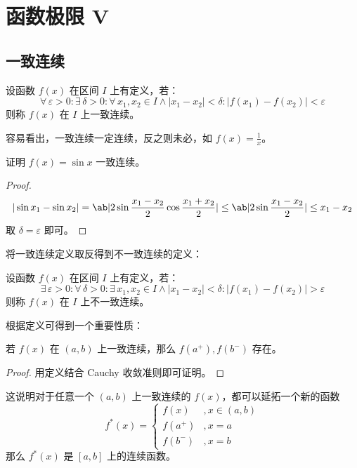 \section{函数极限 V}

\subsection{一致连续}

\begin{definition}[函数的一致连续性]
	设函数 $f(x)$ 在区间 $I$ 上有定义，若：
	$$
	\forall\,\varepsilon > 0: \exists\,\delta > 0: \forall\,x_1, x_2 \in I \land |x_1 - x_2| < \delta: |f(x_1) - f(x_2)| < \varepsilon
	$$
	则称 $f(x)$ 在 $I$ 上一致连续。
\end{definition}

容易看出，一致连续一定连续，反之则未必，如 $f(x) = \frac{1}{x}$。

\begin{example}
	证明 $f(x) = \sin x$ 一致连续。

	\begin{proof}
		$$
		|\sin x_1 - \sin x_2| = \ab|2 \sin \frac{x_1 - x_2}{2} \cos \frac{x_1 + x_2}{2}| \le \ab|2 \sin \frac{x_1 - x_2}{2}| \le x_1 - x_2
		$$
		取 $\delta = \varepsilon$ 即可。
	\end{proof}
\end{example}

将一致连续定义取反得到不一致连续的定义：

\begin{definition}[函数不一致连续]
	设函数 $f(x)$ 在区间 $I$ 上有定义，若：
	$$
	\exists\,\varepsilon > 0: \forall\,\delta > 0: \exists\,x_1, x_2 \in I \land |x_1 - x_2| < \delta: |f(x_1) - f(x_2)| > \varepsilon
	$$
	则称 $f(x)$ 在 $I$ 上不一致连续。
\end{definition}

根据定义可得到一个重要性质：

\begin{theorem}
	若 $f(x)$ 在 $(a, b)$ 上一致连续，那么 $f(a^+), f(b^-)$ 存在。

	\begin{proof}
		用定义结合 Cauchy 收敛准则即可证明。
	\end{proof}
\end{theorem}

这说明对于任意一个 $(a, b)$ 上一致连续的 $f(x)$，都可以延拓一个新的函数
$$
f^*(x) = \begin{cases}
	f(x) & , x \in (a, b) \\
	f(a^+) & , x = a \\
	f(b^-) & , x = b
\end{cases}
$$
那么 $f^*(x)$ 是 $[a, b]$ 上的连续函数。

